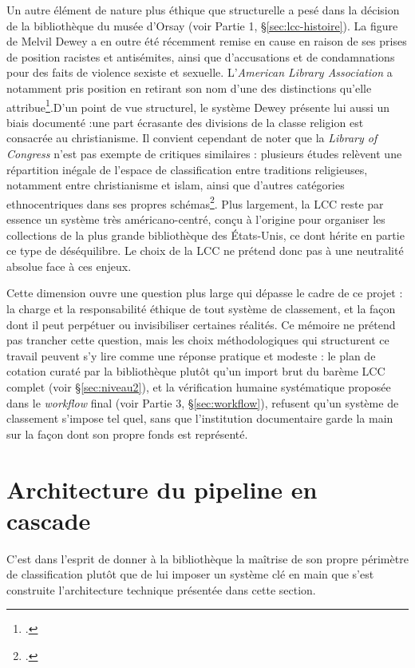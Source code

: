 Un autre élément de nature plus éthique que structurelle a pesé dans la décision de la bibliothèque du musée d'Orsay (voir Partie 1, \S\ref{sec:lcc-histoire}).
La figure de Melvil Dewey a en outre été récemment remise en cause en raison de ses prises de position racistes et antisémites, ainsi que d'accusations et de condamnations pour des faits de violence sexiste et sexuelle. L'\textit{American Library Association} a notamment pris position en retirant son nom d'une des distinctions qu'elle attribue\footcite{ala2019}.D'un point de vue structurel, le système Dewey présente lui aussi un biais documenté :une part écrasante des divisions de la classe religion est consacrée au christianisme. Il convient cependant de noter que la \textit{Library of Congress} n'est pas exempte de critiques similaires : plusieurs études relèvent une répartition inégale de l'espace de classification entre traditions religieuses, notamment entre christianisme et islam, ainsi que d'autres catégories ethnocentriques dans ses propres schémas\footcite{bakerislam2020,knowlton2005}. Plus largement, la LCC reste par essence un système très américano-centré, conçu à l'origine pour organiser les collections de la plus grande bibliothèque des États-Unis, ce dont hérite en partie ce type de déséquilibre. Le choix de la LCC ne prétend donc pas à une neutralité absolue face à ces enjeux.


Cette dimension ouvre une question plus large qui dépasse le cadre de ce projet : la charge et la responsabilité éthique de tout système de classement, et la façon dont il peut perpétuer ou invisibiliser certaines réalités. Ce mémoire ne prétend pas trancher cette question, mais les choix méthodologiques qui structurent ce travail peuvent s'y lire comme une réponse pratique et modeste : le plan de cotation curaté par la bibliothèque plutôt qu'un import brut du barème LCC complet (voir \S\ref{sec:niveau2}), et la vérification humaine systématique proposée dans le \textit{workflow} final (voir Partie 3, \S\ref{sec:workflow}), refusent qu'un système de classement s'impose tel quel, sans que l'institution documentaire garde la main sur la façon dont son propre fonds est représenté.

\section{Architecture du pipeline en cascade}


C'est dans l'esprit de donner à la bibliothèque la maîtrise de son propre périmètre de classification plutôt que de lui imposer un système clé en main  que s'est construite l'architecture technique présentée dans cette section.

